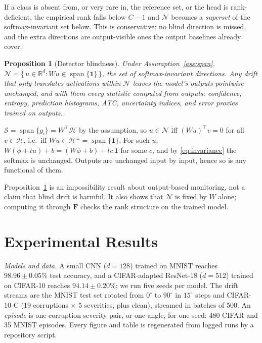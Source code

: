 \documentclass[conference]{IEEEtran}
\newtheorem{proposition}{Proposition}
\newcommand{\R}{\mathbb{R}}
\newcommand{\F}{\mathbf{F}}
\newcommand{\act}{\phi}
\DeclareMathOperator{\spn}{span}
\begin{document}
If a class is absent from, or very rare in, the reference set, or the head is
rank-deficient, the empirical rank falls below $C-1$ and $\mathcal{N}$ becomes
a \emph{superset} of the softmax-invariant set below. This is conservative: no
blind direction is missed, and the extra directions are output-visible ones
the output baselines already cover.

\begin{proposition}[Detector blindness]
\label{prop:blind}
Under Assumption~\ref{ass:span},
$\mathcal{N} = \{\, u \in \R^d : Wu \in \spn\{\mathbf{1}\} \,\}$, the set of
softmax-invariant directions. Any drift that only translates activations
within $\mathcal{N}$ leaves the model's outputs pointwise unchanged, and with
them every statistic computed from outputs: confidence, entropy, prediction
histograms, ATC, uncertainty indices, and error proxies trained on
outputs.
\end{proposition}

\begin{IEEEproof}
$\mathcal{S} = \spn\{g_i\} = W^\top\!\mathcal{H}$ by the assumption, so
$u \in \mathcal{N}$ iff $(Wu)^\top v = 0$ for all $v \in \mathcal{H}$, i.e.\
iff $Wu \in \mathcal{H}^\perp = \spn\{\mathbf{1}\}$. For such $u$,
$W(\act + tu) + b = (W\act + b) + tc\,\mathbf{1}$ for some $c$, and by
\eqref{eq:invariance} the softmax is unchanged. Outputs are unchanged input by
input, hence so is any functional of them.
\end{IEEEproof}

Proposition~\ref{prop:blind} is an impossibility result about output-based
monitoring, not a claim that blind drift is harmful. It also shows that
$\mathcal{N}$ is fixed by $W$ alone; computing it through $\F$ checks the rank
structure on the trained model.

\section{Experimental Results}
\label{sec:experiments}

\textit{Models and data.}
A small CNN ($d = 128$) trained on MNIST reaches $98.96 \pm 0.05\%$ test
accuracy, and a CIFAR-adapted ResNet-18 ($d = 512$) trained on CIFAR-10
reaches $94.14 \pm 0.20\%$; we run five seeds per model. The drift streams are
the MNIST test set rotated from $0^\circ$ to $90^\circ$ in $15^\circ$ steps and
CIFAR-10-C \cite{hendrycks2019benchmarking} (19 corruptions $\times$ 5
severities, plus clean), streamed in batches of 500. An \emph{episode} is one
corruption-severity pair, or one angle, for one seed: 480 CIFAR and 35 MNIST
episodes. Every figure and table is regenerated from logged runs by a
repository script.
\end{document}
